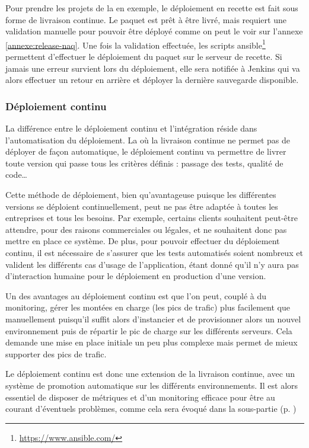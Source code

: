 Pour prendre les projets de la \naq{} en exemple, le déploiement en recette est fait sous forme de livraison continue. Le paquet est prêt à être livré, mais requiert une validation manuelle pour pouvoir être déployé comme on peut le voir sur l'annexe \ref{annexe:release-naq}. Une fois la validation effectuée, les scripts ansible\footnote{\url{https://www.ansible.com/}} permettent d'effectuer le déploiement du paquet sur le serveur de recette. Si jamais une erreur survient lors du déploiement, elle sera notifiée à Jenkins qui va alors effectuer un retour en arrière et déployer la dernière sauvegarde disponible.

\subsubsection{Déploiement continu}

La différence entre le déploiement continu et l'intégration réside dans l'automatisation du déploiement. La où la livraison continue ne permet pas de déployer de façon automatique, le déploiement continu va permettre de livrer toute version qui passe tous les critères définis : passage des tests, qualité de code\ldots

Cette méthode de déploiement, bien qu'avantageuse puisque les différentes versions se déploient continuellement, peut ne pas être adaptée à toutes les entreprises et tous les besoins. Par exemple, certains clients souhaitent peut-être attendre, pour des raisons commerciales ou légales, et ne souhaitent donc pas mettre en place ce système. De plus, pour pouvoir effectuer du déploiement continu, il est nécessaire de s'assurer que les tests automatisés soient nombreux et valident les différents cas d'usage de l'application, étant donné qu'il n'y aura pas d'interaction humaine pour le déploiement en production d'une version.

Un des avantages au déploiement continu est que l'on peut, couplé à du monitoring, gérer les montées en charge (les pics de trafic) plus facilement que manuellement puisqu'il suffit alors d'instancier et de provisionner alors un nouvel environnement puis de répartir le pic de charge sur les différents serveurs. Cela demande une mise en place initiale un peu plus complexe mais permet de mieux supporter des pics de trafic.

Le déploiement continu est donc une extension de la livraison continue, avec un système de promotion automatique sur les différents environnements. Il est alors essentiel de disposer de métriques et d'un monitoring efficace pour être au courant d'éventuels problèmes, comme cela sera évoqué dans la sous-partie  (p. \pageref{paragraph:monitoring})

